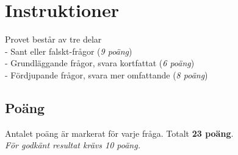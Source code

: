 \documentclass[a4paper,12pt]{exam}  %
\begin{document}
\section*{Instruktioner}
Provet består av tre delar \\
    - Sant eller falskt-frågor (\textit{9 poäng})\\
    - Grundläggande frågor, svara kortfattat (\textit{6 poäng})\\
    - Fördjupande frågor, svara mer omfattande (\textit{8 poäng})

\subsection*{Poäng}
Antalet poäng är markerat för varje fråga. Totalt \textbf{23 poäng}.\\ \textit{För godkänt resultat krävs 10 poäng.}

\vspace{5mm}
\begin{center}
\end{center}
\end{document}

